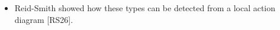 \documentclass[preview]{standalone}
\begin{document}
\begin{center}
\begin{itemize} \item Reid-Smith showed how these types can be detected from a local action diagram [RS26].\end{itemize}
\end{center}
\end{document}

